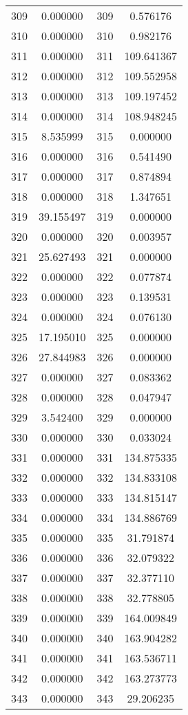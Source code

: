\documentclass[12pt]{article}
\begin{document}
\begin{longtable}{@{}cccc@{}}
309 & 0.000000 & 309 & 0.576176 \\
310 & 0.000000 & 310 & 0.982176 \\
311 & 0.000000 & 311 & 109.641367 \\
312 & 0.000000 & 312 & 109.552958 \\
313 & 0.000000 & 313 & 109.197452 \\
314 & 0.000000 & 314 & 108.948245 \\
315 & 8.535999 & 315 & 0.000000 \\
316 & 0.000000 & 316 & 0.541490 \\
317 & 0.000000 & 317 & 0.874894 \\
318 & 0.000000 & 318 & 1.347651 \\
319 & 39.155497 & 319 & 0.000000 \\
320 & 0.000000 & 320 & 0.003957 \\
321 & 25.627493 & 321 & 0.000000 \\
322 & 0.000000 & 322 & 0.077874 \\
323 & 0.000000 & 323 & 0.139531 \\
324 & 0.000000 & 324 & 0.076130 \\
325 & 17.195010 & 325 & 0.000000 \\
326 & 27.844983 & 326 & 0.000000 \\
327 & 0.000000 & 327 & 0.083362 \\
328 & 0.000000 & 328 & 0.047947 \\
329 & 3.542400 & 329 & 0.000000 \\
330 & 0.000000 & 330 & 0.033024 \\
331 & 0.000000 & 331 & 134.875335 \\
332 & 0.000000 & 332 & 134.833108 \\
333 & 0.000000 & 333 & 134.815147 \\
334 & 0.000000 & 334 & 134.886769 \\
335 & 0.000000 & 335 & 31.791874 \\
336 & 0.000000 & 336 & 32.079322 \\
337 & 0.000000 & 337 & 32.377110 \\
338 & 0.000000 & 338 & 32.778805 \\
339 & 0.000000 & 339 & 164.009849 \\
340 & 0.000000 & 340 & 163.904282 \\
341 & 0.000000 & 341 & 163.536711 \\
342 & 0.000000 & 342 & 163.273773 \\
343 & 0.000000 & 343 & 29.206235 \\

\end{longtable}
\end{document}
